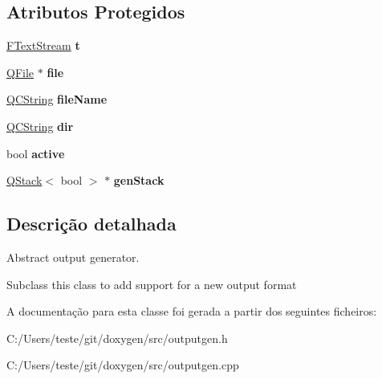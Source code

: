 \subsection*{Atributos Protegidos}
\begin{DoxyCompactItemize}
\item 
\hypertarget{class_output_generator_a88469b5382152f6561677e5875d55b92}{\hyperlink{class_f_text_stream}{F\-Text\-Stream} {\bfseries t}}\label{class_output_generator_a88469b5382152f6561677e5875d55b92}

\item 
\hypertarget{class_output_generator_a125b00c9cda309940cdd1fe058d0aa68}{\hyperlink{class_q_file}{Q\-File} $\ast$ {\bfseries file}}\label{class_output_generator_a125b00c9cda309940cdd1fe058d0aa68}

\item 
\hypertarget{class_output_generator_abb9cd3e430c4eaf05aa259fa96f32305}{\hyperlink{class_q_c_string}{Q\-C\-String} {\bfseries file\-Name}}\label{class_output_generator_abb9cd3e430c4eaf05aa259fa96f32305}

\item 
\hypertarget{class_output_generator_a033c5874d30946a0beab9dc743147f57}{\hyperlink{class_q_c_string}{Q\-C\-String} {\bfseries dir}}\label{class_output_generator_a033c5874d30946a0beab9dc743147f57}

\item 
\hypertarget{class_output_generator_a03c996f9fcf0e10baeb3e700be0c409a}{bool {\bfseries active}}\label{class_output_generator_a03c996f9fcf0e10baeb3e700be0c409a}

\item 
\hypertarget{class_output_generator_a4a02cc4ad8f9b92d3e389221ce8b088b}{\hyperlink{class_q_stack}{Q\-Stack}$<$ bool $>$ $\ast$ {\bfseries gen\-Stack}}\label{class_output_generator_a4a02cc4ad8f9b92d3e389221ce8b088b}

\end{DoxyCompactItemize}


\subsection{Descrição detalhada}
Abstract output generator.

Subclass this class to add support for a new output format 

A documentação para esta classe foi gerada a partir dos seguintes ficheiros\-:\begin{DoxyCompactItemize}
\item 
C\-:/\-Users/teste/git/doxygen/src/outputgen.\-h\item 
C\-:/\-Users/teste/git/doxygen/src/outputgen.\-cpp\end{DoxyCompactItemize}
